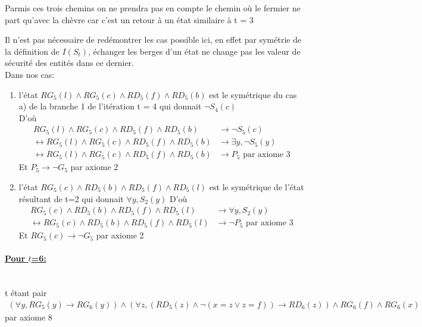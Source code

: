 \documentclass{article}
\begin{document}
\begin{enumerate}
Parmis ces trois chemins on ne prendra pas en compte le chemin où le fermier ne part qu'avec la chèvre car c'est un retour à un état similaire à t = 3

Il n'est pas nécessaire de redémontrer les cas possible ici, en effet par symétrie de la définition de $I(S_t)$, échanger les berges d'un état ne change pas les valeur de sécurité des entités dans ce dernier.\\Dans nos cas:
\begin{enumerate}
  \item  l'état $RG_5(l) \wedge RG_5(c) \wedge RD_5(f) \wedge RD_5(b)$ est le symétrique du cas a) de la branche 1 de l'itération t = 4 qui donnait $\neg S_4(c)$\\
   D'où
  \begin{align*}
    RG_5(l) \wedge RG_5(c) \wedge RD_5(f) \wedge RD_5(b) &\to \neg S_5(c)\\
    \leftrightarrow RG_5(l) \wedge RG_5(c) \wedge RD_5(f) \wedge RD_5(b) &\to \exists y, \neg S_5(y)\\
    \leftrightarrow RG_5(l) \wedge RG_5(c) \wedge RD_5(f) \wedge RD_5(b) &\to P_5 \text{ par axiome 3}
  \end{align*}
  Et $P_5 \to \neg G_5$ par axiome 2
  \item  l'état $RG_5(c) \wedge RD_5(b) \wedge RD_5(f) \wedge RD_5(l)$ est le symétrique de l'état résultant de t=2 qui donnait $\forall y, S_2(y)$
   D'où
  \begin{align*}
    RG_5(c) \wedge RD_5(b) \wedge RD_5(f) \wedge RD_5(l) &\to \forall y, S_2(y)\\
    \leftrightarrow RG_5(c) \wedge RD_5(b) \wedge RD_5(f) \wedge RD_5(l) &\to \neg P_5 \text{ par axiome 3}
  \end{align*}
  Et $RG_5(c) \to \neg G_5$ par axiome 2
\end{enumerate}
\end{enumerate}

\paragraph{\underline{Pour $t$=6:}}~~\\
t étant pair
\begin{align*}
    (\forall y, RG_{5}(y) \to RG_{6}(y)) \wedge (\forall z,(RD_{5}(z) \wedge \neg(x=z \vee z=f)) \rightarrow RD_{6}(z)) \wedge RG_6(f) \wedge RG_6(x)
\end{align*} par axiome $ 8$\\
\end{document}
